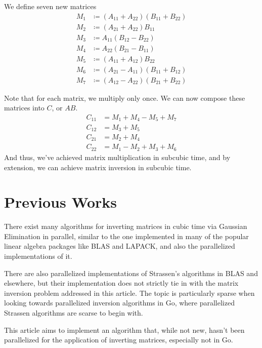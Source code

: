\documentclass[12pt, letterpaper]{article}
\theoremstyle{remark}
\theoremstyle{remark}
\begin{document}
    We define seven new matrices
    \begin{align*}
        M_1 &\coloneqq (A_{11} + A_{22})(B_{11} + B_{22}) \\
        M_2 &\coloneqq (A_{21} + A_{22})B_{11} \\
        M_3 &\coloneqq A_{11}(B_{12} - B_{22}) \\
        M_4 &\coloneqq A_{22}(B_{21} - B_{11}) \\
        M_5 &\coloneqq (A_{11} + A_{12})B_{22} \\
        M_6 &\coloneqq (A_{21} - A_{11})(B_{11} + B_{12}) \\
        M_7 &\coloneqq (A_{12} - A_{22})(B_{21} + B_{22})
    \end{align*}

    Note that for each matrix, we multiply only once. We can 
    now compose these matrices into \(C\), or \(AB\).
    \begin{align*}
        C_{11} &= M_1 + M_4 - M_5 + M_7 \\
        C_{12} &= M_3 + M_5 \\
        C_{21} &= M_2 + M_4 \\
        C_{22} &= M_1 - M_2 + M_3 + M_6
    \end{align*}
    And thus, we've achieved matrix multiplication in subcubic time,
    and by extension, we can achieve matrix inversion in subcubic time.

    \section{Previous Works}

    There exist many algorithms for inverting matrices in 
    cubic time via Gaussian Elimination in parallel, similar to the one implemented in many of the popular linear 
    algebra packages like BLAS and LAPACK, and also the parallelized implementations of it.

    There are also parallelized implementations of Strassen's algorithms in BLAS and elsewhere, but their implementation 
    does not strictly tie in with the matrix inversion problem addressed in this article. The topic is particularly sparse 
    when looking towards parallelized inversion algorithms in Go, where parallelized Strassen algorithms are 
    scarse to begin with.
    
    This article aims to implement an algorithm that, while not new, hasn't been parallelized for 
    the application of inverting matrices, especially not in Go.
\end{document}
